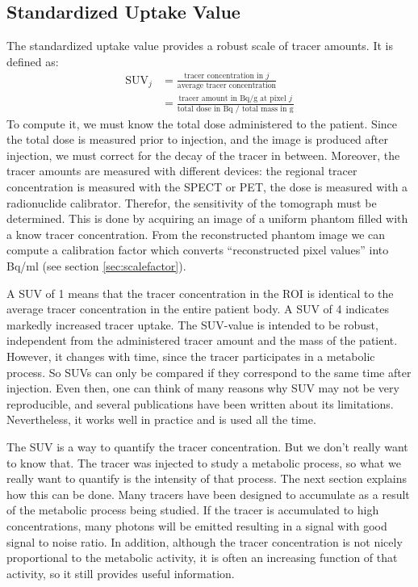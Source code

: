 \documentclass[11pt,oneside]{article}
\begin{document}
\subsection{Standardized Uptake Value}
The standardized uptake value provides a robust scale of tracer amounts. It is
defined as:
\begin{align}
  \mbox{SUV}_j &= \frac{\mbox{tracer concentration in $j$}}
                          {\mbox{average tracer concentration}}\\
  &= \frac{\mbox{tracer amount in Bq/g at pixel $j$}}
                      {\mbox{total dose in Bq / total mass in g}}
\end{align}
To compute it, we must know the total dose administered to the patient. Since
the total dose is measured prior to injection, and the image is produced after
injection, we must correct for the decay of the tracer in between. Moreover,
the tracer amounts are measured with different devices: the regional tracer
concentration is measured with the SPECT or PET, the dose is measured with a
radionuclide calibrator. Therefor, the sensitivity of the tomograph must be
determined. This is done by acquiring an image of a uniform phantom filled
with a know tracer concentration. From the reconstructed phantom image we can
compute a calibration factor which converts ``reconstructed pixel values''
into Bq/ml (see section \ref{sec:scalefactor}).

A SUV of 1 means that the tracer concentration in the ROI is identical
to the average tracer concentration in the entire patient body. A SUV
of 4 indicates markedly increased tracer uptake. The SUV-value is
intended to be robust, independent from the administered tracer amount
and the mass of the patient. However, it changes with time, since the
tracer participates in a metabolic process. So SUVs can only be
compared if they correspond to the same time after injection. Even
then, one can think of many reasons why SUV may not be very
reproducible, and several publications have been written about its
limitations.  Nevertheless, it works well in practice and is used all
the time.

The SUV is a way to quantify the tracer concentration. But we don't really
want to know that. The tracer was injected to study a metabolic process, so
what we really want to quantify is the intensity of that process. The next
section explains how this can be done. Many tracers have been designed to
accumulate as a result of the metabolic process being studied. If the tracer
is accumulated to high concentrations, many photons will be emitted resulting
in a signal with good signal to noise ratio. In addition, although the tracer
concentration is not nicely proportional to the metabolic activity, it is
often an increasing function of that activity, so it still provides useful
information.
\end{document}
